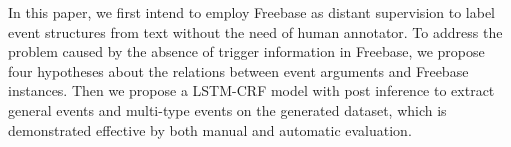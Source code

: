 In this paper, we first intend to employ Freebase as distant supervision to label event structures from text without the need of human annotator. To address the problem caused by the absence of trigger information in Freebase, we propose four hypotheses about the relations between event arguments and Freebase instances. Then we propose a LSTM-CRF model with post inference to extract general events and multi-type events on the generated dataset, which is demonstrated effective by both manual and automatic evaluation.

